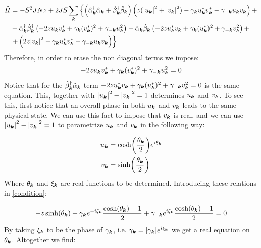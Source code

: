 \begin{align}
\hat{H} &= -S^2JNz + 2JS \sum_{\boldsymbol{k}} \left\{ \left( \hat{\alpha}_{\boldsymbol{k}}^\dagger \hat{\alpha}_{\boldsymbol{k}} +\hat{\beta}_{\boldsymbol{k}}^\dagger \hat{\beta}_{\boldsymbol{k}} \right) \left( z(\abs{u_{\boldsymbol{k}}}^2+\abs{v_{\boldsymbol{k}}}^2) -\gamma_{\boldsymbol{k}}u_{\boldsymbol{k}}^*v_{\boldsymbol{k}}^* - \gamma_{-\boldsymbol{k}}u_{\boldsymbol{k}}v_{\boldsymbol{k}} \right) + \right. \nonumber \\
&+ \hat{\alpha}^\dagger_{\boldsymbol{k}} \hat{\beta}^\dagger_{\boldsymbol{k}} \left( -2zu_{\boldsymbol{k}}v_{\boldsymbol{k}}^* + \gamma_{\boldsymbol{k}}(v_{\boldsymbol{k}}^*)^2+\gamma_{-\boldsymbol{k}}u_{\boldsymbol{k}}^2 \right) + \hat{\alpha}_{\boldsymbol{k}}\hat{\beta}_{\boldsymbol{k}} \left( -2zu_{\boldsymbol{k}}^*v_{\boldsymbol{k}} + \gamma_{\boldsymbol{k}}(u_{\boldsymbol{k}}^*)^2+\gamma_{-\boldsymbol{k}}v_{\boldsymbol{k}}^2 \right) + \nonumber \\
&\left. + \left( 2z\abs{v_{\boldsymbol{k}}}^2 - \gamma_{\boldsymbol{k}}u_{\boldsymbol{k}}^* v_{\boldsymbol{k}}^* - \gamma_{-\boldsymbol{k}}u_{\boldsymbol{k}}v_{\boldsymbol{k}} \right) \right\} \label{AfterBogo}
\end{align}
Therefore, in order to erase the non diagonal terms we impose:
\begin{equation}
\label{condition}
-2zu_{\boldsymbol{k}}v_{\boldsymbol{k}}^* + \gamma_{\boldsymbol{k}}(v_{\boldsymbol{k}}^*)^2+\gamma_{-\boldsymbol{k}}u_{\boldsymbol{k}}^2 = 0
\end{equation}
Notice that for the $\hat{\beta}_{\boldsymbol{k}}^\dagger\hat{\alpha}_{\boldsymbol{k}}$ term $-2zu_{\boldsymbol{k}}^*v_{\boldsymbol{k}} + \gamma_{\boldsymbol{k}}(u_{\boldsymbol{k}}^*)^2+\gamma_{-\boldsymbol{k}}v_{\boldsymbol{k}}^2=0$ is the same equation. This, together with $\abs{u_{\boldsymbol{k}}}^2-\abs{v_{\boldsymbol{k}}}^2 = 1$ determines $u_{\boldsymbol{k}}$ and $v_{\boldsymbol{k}}$. To see this, first notice that an overall phase in both $u_{\boldsymbol{k}}$ and $v_{\boldsymbol{k}}$ leads to the same physical state. We can use this fact to impose that $v_{\boldsymbol{k}}$ is real, and we can use $\abs{u_{\boldsymbol{k}}}^2-\abs{v_{\boldsymbol{k}}}^2 = 1$ to parametrize $u_{\boldsymbol{k}}$ and $v_{\boldsymbol{k}}$ in the following way:

\begin{align}
u_{\boldsymbol{k}} &= \cosh(\frac{\theta_{\boldsymbol{k}}}{2})e^{i \xi_{\boldsymbol{k}}} \label{Bogou} \\
v_{\boldsymbol{k}} &= \sinh(\frac{\theta_{\boldsymbol{k}}}{2}) \label{Bogov}
\end{align}
Where $\theta_{\boldsymbol{k}}$ and $\xi_{\boldsymbol{k}}$ are real functions to be determined. Introducing these relations in \ref{condition}:

\begin{equation}
- z\sinh(\theta_{\boldsymbol{k}}) +\gamma_{\boldsymbol{k}}e^{-i \xi_{\boldsymbol{k}}}\frac{ \cosh(\theta_{\boldsymbol{k}})-1}{2} +\gamma_{-\boldsymbol{k}}e^{i\xi_{\boldsymbol{k}}}\frac{ \cosh(\theta_{\boldsymbol{k}})+1}{2} = 0
\end{equation}
By taking $\xi_{\boldsymbol{k}}$ to be the phase of $\gamma_{\boldsymbol{k}}$, i.e. $\gamma_{\boldsymbol{k}} = \abs{\gamma_{\boldsymbol{k}}} e^{i\xi_{\boldsymbol{k}}}$ we get a real equation on $\theta_{\boldsymbol{k}}$. Altogether we find:

